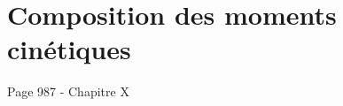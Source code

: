 \chapter{Composition des moments cinétiques}
\label{chapter:composition_moments_cinetiques}
Page 987 - Chapitre X
